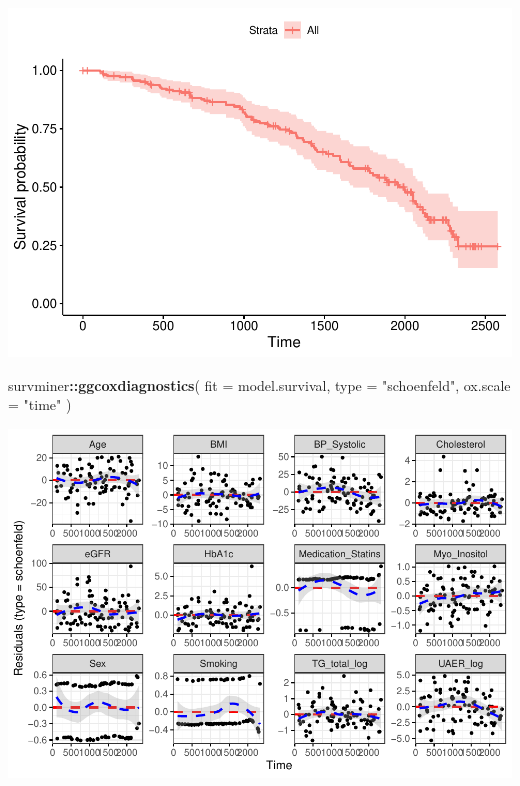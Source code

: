 \documentclass[]{article}
\newenvironment{Shaded}{\begin{snugshade}}{\end{snugshade}}
\newcommand{\DataTypeTok}[1]{\textcolor[rgb]{0.13,0.29,0.53}{#1}}
\newcommand{\KeywordTok}[1]{\textcolor[rgb]{0.13,0.29,0.53}{\textbf{#1}}}
\newcommand{\NormalTok}[1]{#1}
\newcommand{\OperatorTok}[1]{\textcolor[rgb]{0.81,0.36,0.00}{\textbf{#1}}}
\newcommand{\StringTok}[1]{\textcolor[rgb]{0.31,0.60,0.02}{#1}}
\begin{document}
\includegraphics{0033_PROFIL--Metabolomics_files/figure-latex/Myo-I-Matched-Mortality-Adjusted-Diagnostics-1.pdf}

\begin{Shaded}
\begin{Highlighting}[]
\NormalTok{survminer}\OperatorTok{::}\KeywordTok{ggcoxdiagnostics}\NormalTok{(}
  \DataTypeTok{fit =}\NormalTok{ model.survival, }
  \DataTypeTok{type =} \StringTok{"schoenfeld"}\NormalTok{, }
  \DataTypeTok{ox.scale =} \StringTok{"time"}
\NormalTok{)}
\end{Highlighting}
\end{Shaded}

\includegraphics{0033_PROFIL--Metabolomics_files/figure-latex/Myo-I-Matched-Mortality-Adjusted-Diagnostics-2.pdf}

\newpage
\end{document}
